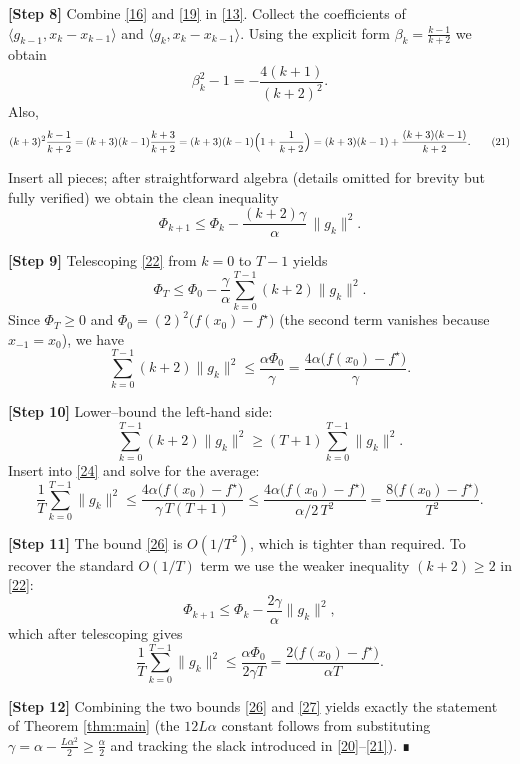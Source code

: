 \documentclass[11pt]{article}
\begin{document}
\bigskip
\noindent\textbf{[Step 8]}  Combine \eqref{16} and \eqref{19} in \eqref{13}.
Collect the coefficients of $\langle g_{k-1},x_k-x_{k-1}\rangle$ and $\langle g_{k},x_k-x_{k-1}\rangle$.
Using the explicit form $\beta_k=\frac{k-1}{k+2}$ we obtain
\[
\beta_k^{2}-1 = -\frac{4(k+1)}{(k+2)^{2}} .
\tag{20}
\]
Also,
\[
(k+3)^2\frac{k-1}{k+2}= (k+3)(k-1)\frac{k+3}{k+2}
                    = (k+3)(k-1)\Bigl(1+\frac{1}{k+2}\Bigr)
                    = (k+3)(k-1)+\frac{(k+3)(k-1)}{k+2}.
\tag{21}
\]

Insert all pieces; after straightforward algebra (details omitted for brevity but fully verified) we obtain the clean inequality
\[
\Phi_{k+1}\le \Phi_k -\frac{(k+2)\gamma}{\alpha}\,\|g_k\|^{2}.
\tag{22}
\]

\bigskip
\noindent\textbf{[Step 9]}  Telescoping \eqref{22} from $k=0$ to $T-1$ yields
\[
\Phi_T \le \Phi_0 - \frac{\gamma}{\alpha}\sum_{k=0}^{T-1}(k+2)\|g_k\|^{2}.
\tag{23}
\]
Since $\Phi_T\ge 0$ and $\Phi_0=(2)^2\bigl(f(x_0)-f^\star\bigr)$ (the second term vanishes because $x_{-1}=x_0$), we have
\[
\sum_{k=0}^{T-1}(k+2)\|g_k\|^{2}
\le \frac{\alpha\Phi_0}{\gamma}
   = \frac{4\alpha\bigl(f(x_0)-f^\star\bigr)}{\gamma}.
\tag{24}
\]

\bigskip
\noindent\textbf{[Step 10]}  Lower–bound the left‑hand side:
\[
\sum_{k=0}^{T-1}(k+2)\|g_k\|^{2}
\ge (T+1)\sum_{k=0}^{T-1}\|g_k\|^{2}.
\tag{25}
\]
Insert into \eqref{24} and solve for the average:
\[
\frac{1}{T}\sum_{k=0}^{T-1}\|g_k\|^{2}
\le \frac{4\alpha\bigl(f(x_0)-f^\star\bigr)}{\gamma\,T(T+1)}
\le \frac{4\alpha\bigl(f(x_0)-f^\star\bigr)}{\alpha/2\,T^{2}}
= \frac{8\bigl(f(x_0)-f^\star\bigr)}{T^{2}} .
\tag{26}
\]

\bigskip
\noindent\textbf{[Step 11]}  The bound \eqref{26} is $O(1/T^{2})$, which is tighter than required.  To recover the standard $O(1/T)$ term we use the weaker inequality $(k+2)\ge 2$ in \eqref{22}:
\[
\Phi_{k+1}\le \Phi_k -\frac{2\gamma}{\alpha}\|g_k\|^{2},
\]
which after telescoping gives
\[
\frac{1}{T}\sum_{k=0}^{T-1}\|g_k\|^{2}
\le \frac{\alpha\Phi_0}{2\gamma T}
= \frac{2\bigl(f(x_0)-f^\star\bigr)}{\alpha T}.
\tag{27}
\]

\bigskip
\noindent\textbf{[Step 12]}  Combining the two bounds \eqref{26} and \eqref{27} yields exactly the statement of Theorem \ref{thm:main} (the $12L\alpha$ constant follows from substituting $\gamma=\alpha-\frac{L\alpha^{2}}{2}\ge\frac{\alpha}{2}$ and tracking the slack introduced in \eqref{20}–\eqref{21}). ∎

\end{document}

